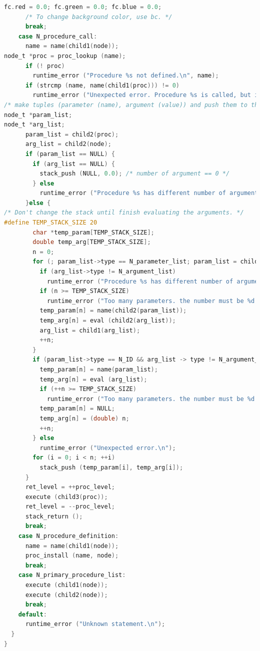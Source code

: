 \begin{lstlisting}[language=C]
      fc.red = 0.0; fc.green = 0.0; fc.blue = 0.0;
      /* To change background color, use bc. */
      break;
    case N_procedure_call:
      name = name(child1(node));
node_t *proc = proc_lookup (name);
      if (! proc)
        runtime_error ("Procedure %s not defined.\n", name);
      if (strcmp (name, name(child1(proc))) != 0)
        runtime_error ("Unexpected error. Procedure %s is called, but invoked procedure is %s.\n", name, name(child1(proc)));
/* make tuples (parameter (name), argument (value)) and push them to the stack */
node_t *param_list;
node_t *arg_list;
      param_list = child2(proc);
      arg_list = child2(node);
      if (param_list == NULL) {
        if (arg_list == NULL) {
          stack_push (NULL, 0.0); /* number of argument == 0 */
        } else
          runtime_error ("Procedure %s has different number of argument and parameter.\n", name);
      }else {
/* Don't change the stack until finish evaluating the arguments. */
#define TEMP_STACK_SIZE 20
        char *temp_param[TEMP_STACK_SIZE];
        double temp_arg[TEMP_STACK_SIZE];
        n = 0;
        for (; param_list->type == N_parameter_list; param_list = child1(param_list)) {
          if (arg_list->type != N_argument_list)
            runtime_error ("Procedure %s has different number of argument and parameter.\n", name);
          if (n >= TEMP_STACK_SIZE)
            runtime_error ("Too many parameters. the number must be %d or less.\n", TEMP_STACK_SIZE);
          temp_param[n] = name(child2(param_list));
          temp_arg[n] = eval (child2(arg_list));
          arg_list = child1(arg_list);
          ++n;
        }
        if (param_list->type == N_ID && arg_list -> type != N_argument_list) {
          temp_param[n] = name(param_list);
          temp_arg[n] = eval (arg_list);
          if (++n >= TEMP_STACK_SIZE)
            runtime_error ("Too many parameters. the number must be %d or less.\n", TEMP_STACK_SIZE);
          temp_param[n] = NULL;
          temp_arg[n] = (double) n;
          ++n;
        } else
          runtime_error ("Unexpected error.\n");
        for (i = 0; i < n; ++i)
          stack_push (temp_param[i], temp_arg[i]);
      }
      ret_level = ++proc_level;
      execute (child3(proc));
      ret_level = --proc_level;
      stack_return ();
      break;
    case N_procedure_definition:
      name = name(child1(node));
      proc_install (name, node);
      break;
    case N_primary_procedure_list:
      execute (child1(node));
      execute (child2(node));
      break;
    default:
      runtime_error ("Unknown statement.\n");
  }
}
\end{lstlisting}

